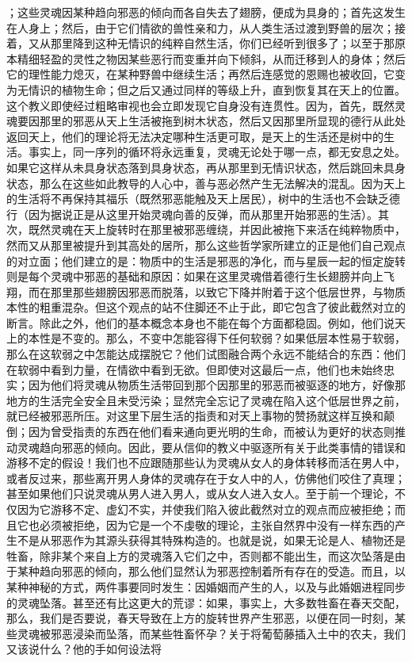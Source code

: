 ；这些灵魂因某种趋向邪恶的倾向而各自失去了翅膀，便成为具身的；首先这发生在人身上；然后，由于它们情欲的兽性亲和力，从人类生活过渡到野兽的层次；接着，又从那里降到这种无情识的纯粹自然生活，你们已经听到很多了；以至于那原本精细轻盈的灵性之物因某些恶行而变重并向下倾斜，从而迁移到人的身体；然后它的理性能力熄灭，在某种野兽中继续生活；再然后连感觉的恩赐也被收回，它变为无情识的植物生命；但之后又通过同样的等级上升，直到恢复其在天上的位置。这个教义即使经过粗略审视也会立即发现它自身没有连贯性。因为，首先，既然灵魂要因那里的邪恶从天上生活被拖到树木状态，然后又因那里所显现的德行从此处返回天上，他们的理论将无法决定哪种生活更可取，是天上的生活还是树中的生活。事实上，同一序列的循环将永远重复，灵魂无论处于哪一点，都无安息之处。如果它这样从未具身状态落到具身状态，再从那里到无情识状态，然后跳回未具身状态，那么在这些如此教导的人心中，善与恶必然产生无法解决的混乱。因为天上的生活将不再保持其福乐（既然邪恶能触及天上居民），树中的生活也不会缺乏德行（因为据说正是从这里开始灵魂向善的反弹，而从那里开始邪恶的生活）。其次，既然灵魂在天上旋转时在那里被邪恶缠绕，并因此被拖下来活在纯粹物质中，然而又从那里被提升到其高处的居所，那么这些哲学家所建立的正是他们自己观点的对立面；他们建立的是：物质中的生活是邪恶的净化，而与星辰一起的恒定旋转则是每个灵魂中邪恶的基础和原因：如果在这里灵魂借着德行生长翅膀并向上飞翔，而在那里那些翅膀因邪恶而脱落，以致它下降并附着于这个低层世界，与物质本性的粗重混杂。但这个观点的站不住脚还不止于此，即它包含了彼此截然对立的断言。除此之外，他们的基本概念本身也不能在每个方面都稳固。例如，他们说天上的本性是不变的。那么，不变中怎能容得下任何软弱？如果低层本性易于软弱，那么在这软弱之中怎能达成摆脱它？他们试图融合两个永远不能结合的东西：他们在软弱中看到力量，在情欲中看到无欲。但即使对这最后一点，他们也未始终忠实；因为他们将灵魂从物质生活带回到那个因那里的邪恶而被驱逐的地方，好像那地方的生活完全安全且未受污染；显然完全忘记了灵魂在陷入这个低层世界之前，就已经被邪恶所压。对这里下层生活的指责和对天上事物的赞扬就这样互换和颠倒；因为曾受指责的东西在他们看来通向更光明的生命，而被认为更好的状态则推动灵魂趋向邪恶的倾向。因此，要从信仰的教义中驱逐所有关于此类事情的错误和游移不定的假设！我们也不应跟随那些认为灵魂从女人的身体转移而活在男人中，或者反过来，那些离开男人身体的灵魂存在于女人中的人，仿佛他们咬住了真理；甚至如果他们只说灵魂从男人进入男人，或从女人进入女人。至于前一个理论，不仅因为它游移不定、虚幻不实，并使我们陷入彼此截然对立的观点而应被拒绝；而且它也必须被拒绝，因为它是一个不虔敬的理论，主张自然界中没有一样东西的产生不是从邪恶作为其源头获得其特殊构造的。也就是说，如果无论是人、植物还是牲畜，除非某个来自上方的灵魂落入它们之中，否则都不能出生，而这次坠落是由于某种趋向邪恶的倾向，那么他们显然认为邪恶控制着所有存在的受造。而且，以某种神秘的方式，两件事要同时发生：因婚姻而产生的人，以及与此婚姻进程同步的灵魂坠落。甚至还有比这更大的荒谬：如果，事实上，大多数牲畜在春天交配，那么，我们是否要说，春天导致在上方的旋转世界产生邪恶，以便在同一时刻，某些灵魂被邪恶浸染而坠落，而某些牲畜怀孕？关于将葡萄藤插入土中的农夫，我们又该说什么？他的手如何设法将